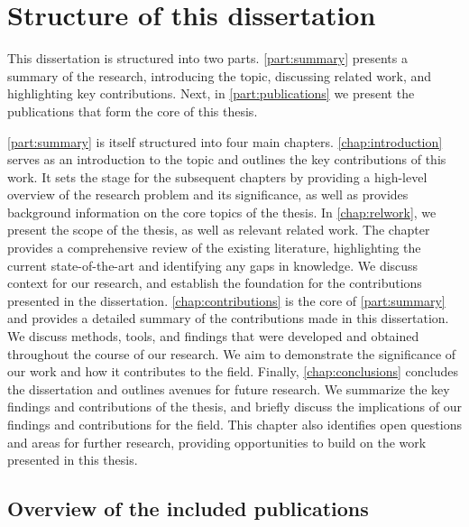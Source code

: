 \section{Structure of this dissertation}

This dissertation is structured into two parts.
\cref{part:summary} presents a summary of the research, introducing the topic, discussing related work, and highlighting key contributions.
Next, in \cref{part:publications} we present the publications that form the core of this thesis.

\cref{part:summary} is itself structured into four main chapters.
\cref{chap:introduction} serves as an introduction to the topic and outlines the key contributions of this work.
It sets the stage for the subsequent chapters by providing a high-level overview of the research problem and its significance, as well as provides background information on the core topics of the thesis.
In \cref{chap:relwork}, we present the scope of the thesis, as well as relevant related work.
The chapter provides a comprehensive review of the existing literature, highlighting the current state-of-the-art and identifying any gaps in knowledge.
We discuss context for our research, and establish the foundation for the contributions presented in the dissertation.
\cref{chap:contributions} is the core of \cref{part:summary} and provides a detailed summary of the contributions made in this dissertation.
We discuss methods, tools, and findings that were developed and obtained throughout the course of our research.
We aim to demonstrate the significance of our work and how it contributes to the field.
Finally, \cref{chap:conclusions} concludes the dissertation and outlines avenues for future research.
We summarize the key findings and contributions of the thesis, and briefly discuss the implications of our findings and contributions for the field.
This chapter also identifies open questions and areas for further research, providing opportunities to build on the work presented in this thesis.

\subsection{Overview of the included publications}

